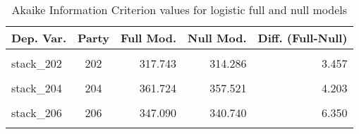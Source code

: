 \documentclass[
]{article}
\begin{document}
\begin{table}[!h]

\caption{\label{tab:unnamed-chunk-13}Akaike Information Criterion values for logistic full and null models 
        \label{table:logit_aic_be_du}}
\centering
\begin{tabular}[t]{lcrrr}
\toprule
Dep. Var. & Party & Full Mod. & Null Mod. & Diff. (Full-Null)\\
\midrule
\cellcolor{gray!6}{stack\_201} & \cellcolor{gray!6}{201} & \cellcolor{gray!6}{256.725} & \cellcolor{gray!6}{261.229} & \cellcolor{gray!6}{-4.504}\\
stack\_202 & 202 & 317.743 & 314.286 & 3.457\\
\cellcolor{gray!6}{stack\_203} & \cellcolor{gray!6}{203} & \cellcolor{gray!6}{572.088} & \cellcolor{gray!6}{581.032} & \cellcolor{gray!6}{-8.944}\\
stack\_204 & 204 & 361.724 & 357.521 & 4.203\\
\cellcolor{gray!6}{stack\_205} & \cellcolor{gray!6}{205} & \cellcolor{gray!6}{486.627} & \cellcolor{gray!6}{477.614} & \cellcolor{gray!6}{9.013}\\
\addlinespace
stack\_206 & 206 & 347.090 & 340.740 & 6.350\\
\cellcolor{gray!6}{stack\_207} & \cellcolor{gray!6}{207} & \cellcolor{gray!6}{171.854} & \cellcolor{gray!6}{163.767} & \cellcolor{gray!6}{8.087}\\
\bottomrule
\end{tabular}
\end{table}
\end{document}
